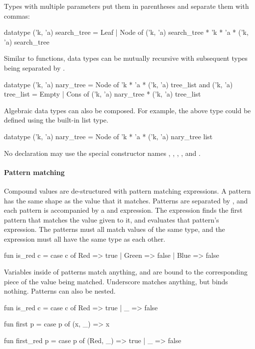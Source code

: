 \documentclass[12pt,a4paper]{book}
\begin{document}
Types with multiple parameters put them in parentheses and separate them with commas:
\begin{smlcode}
datatype ('k, 'a) search_tree =
  Leaf
| Node of ('k, 'a) search_tree * 'k * 'a * ('k, 'a) search_tree
\end{smlcode}

Similar to functions, data types can be mutually recursive with subsequent types being separated by
.
\begin{smlcode}
datatype ('k, 'a) nary_tree =
  Node of 'k * 'a * ('k, 'a) tree_list
and ('k, 'a) tree_list =
  Empty
| Cons of ('k, 'a) nary_tree * ('k, 'a) tree_list
\end{smlcode}

Algebraic data types can also be composed. For example, the above
 type could be defined using the built-in list type.
\begin{smlcode}
datatype ('k, 'a) nary_tree =
  Node of 'k * 'a * ('k, 'a) nary_tree list
\end{smlcode}

No  declaration may use the special constructor names
, , , \smlinline{::}, and
. 


\paragraph{Pattern matching}
Compound values are de-structured with pattern matching 
expressions. A pattern has the same shape as the value that it matches. Patterns are separated by \smlinline{|}, and each pattern is accompanied by a \smlinline{=>} and expression. The  expression finds the first pattern that matches the value given to it, and evaluates that pattern's expression. The patterns must all match values of the same type, and the expression must all have the same type as each other.
\begin{smlcode}
fun is_red c =
  case c of
    Red => true
  | Green => false
  | Blue => false
\end{smlcode}

Variables inside of patterns match anything, and are bound to the corresponding piece of the value being matched. Underscore \smlinline{_} matches anything, but binds nothing. Patterns can also be nested.
\begin{smlcode}
fun is_red c =
  case c of
    Red => true
  | _ => false

fun first p =
  case p of
    (x, _) => x

fun first_red p =
  case p of
    (Red, _) => true
  | _ => false
\end{smlcode}
\end{document}
